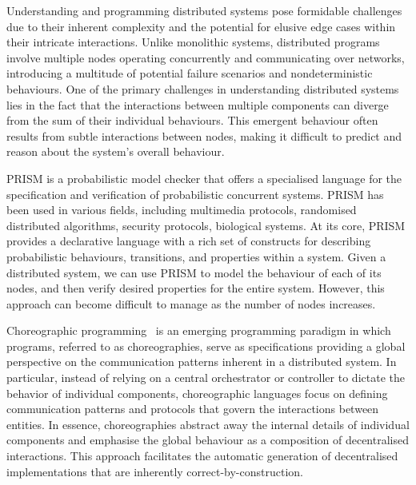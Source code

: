 Understanding and programming distributed systems pose formidable
challenges due to their inherent complexity and the potential for
elusive edge cases
within their intricate interactions. Unlike monolithic systems,
distributed programs involve multiple nodes operating concurrently and
communicating over networks, introducing a multitude of potential
failure scenarios and nondeterministic behaviours.
%
One of the primary challenges in understanding distributed systems
lies in the fact that the interactions between multiple components can
diverge from the sum of their individual behaviours. This emergent
behaviour often results from subtle interactions between nodes, making
it difficult to predict and reason about the system's overall
behaviour.

PRISM \cite{PRISMdoc} is a probabilistic model checker that offers a
specialised language for the specification and verification of
probabilistic concurrent systems. PRISM has been used in various
fields, including multimedia protocols, randomised distributed
algorithms, security protocols, biological systems.  At its core,
PRISM provides a declarative language with a rich set of constructs
for describing probabilistic behaviours, transitions, and properties
within a system.  
%
Given a distributed system, we can use PRISM to model the behaviour of
each of its nodes,
and then verify desired properties for the entire system. However,
this approach can become difficult to manage as the number of nodes
increases.

%

Choreographic programming~\cite{M23} is an emerging programming
paradigm in which programs, referred to as choreographies, serve as
specifications providing a global perspective on the communication
patterns inherent in a distributed system. 
%
In particular, instead of relying on a central orchestrator or
controller to dictate the behavior of individual components,
choreographic languages focus on defining communication patterns and
protocols that govern the interactions between entities.
%
In essence, choreographies abstract away the internal details of
individual components and emphasise the global behaviour as a
composition of decentralised interactions. %
%
This approach facilitates the automatic generation of decentralised
implementations that are inherently correct-by-construction.

